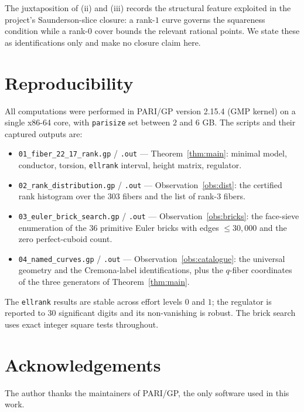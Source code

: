 \documentclass[11pt,reqno]{amsart}
\theoremstyle{plain}
\theoremstyle{definition}
\theoremstyle{remark}
\begin{document}
The juxtaposition of (ii) and (iii) records the structural feature exploited in
the project's Saunderson-slice closure: a rank-$1$ curve governs the squareness
condition while a rank-$0$ cover bounds the relevant rational points. We state
these as identifications only and make no closure claim here.

\section{Reproducibility}\label{sec:repro}

All computations were performed in PARI/GP version 2.15.4 (GMP kernel) on a
single x86-64 core, with \texttt{parisize} set between $2$ and $6$ GB. The
scripts and their captured outputs are:
\begin{itemize}
  \item \texttt{01\_fiber\_22\_17\_rank.gp} / \texttt{.out} ---
        Theorem~\ref{thm:main}: minimal model, conductor, torsion,
        \texttt{ellrank} interval, height matrix, regulator.
  \item \texttt{02\_rank\_distribution.gp} / \texttt{.out} ---
        Observation~\ref{obs:dist}: the certified rank histogram over the
        $303$ fibers and the list of rank-$3$ fibers.
  \item \texttt{03\_euler\_brick\_search.gp} / \texttt{.out} ---
        Observation~\ref{obs:bricks}: the face-sieve enumeration of the $36$
        primitive Euler bricks with edges $\le 30{,}000$ and the zero
        perfect-cuboid count.
  \item \texttt{04\_named\_curves.gp} / \texttt{.out} ---
        Observation~\ref{obs:catalogue}: the universal geometry and the
        Cremona-label identifications, plus the $q$-fiber coordinates of the
        three generators of Theorem~\ref{thm:main}.
\end{itemize}
The \texttt{ellrank} results are stable across effort levels $0$ and $1$; the
regulator is reported to $30$ significant digits and its non-vanishing is
robust. The brick search uses exact integer square tests throughout.

\section*{Acknowledgements}
The author thanks the maintainers of PARI/GP, the only software used in this
work.
\end{document}
